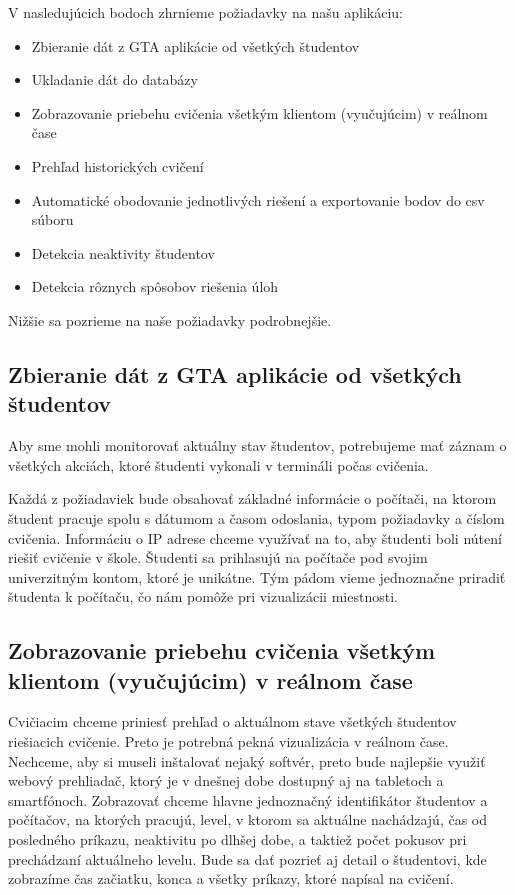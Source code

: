 V nasledujúcich bodoch zhrnieme požiadavky na našu aplikáciu:

\begin{itemize}
	\item Zbieranie dát z GTA aplikácie od všetkých študentov
	\item Ukladanie dát do databázy
	\item Zobrazovanie priebehu cvičenia všetkým klientom (vyučujúcim) v reálnom čase
	\item Prehľad historických cvičení
	\item Automatické obodovanie jednotlivých riešení a exportovanie bodov do csv súboru
	\item Detekcia neaktivity študentov
	\item Detekcia rôznych spôsobov riešenia úloh
\end{itemize}

Nižšie sa pozrieme na naše požiadavky podrobnejšie.

\subsection{Zbieranie dát z GTA aplikácie od všetkých študentov}
\label{sec:apprequirements:gtadata}

Aby sme mohli monitorovať aktuálny stav študentov, potrebujeme mať záznam o
všetkých akciách, ktoré študenti vykonali v termináli počas cvičenia.

Každá z požiadaviek bude obsahovať základné informácie o počítači, na ktorom
študent pracuje spolu s dátumom a časom odoslania, typom požiadavky a číslom cvičenia.
Informáciu o IP adrese chceme využívať na to, aby študenti boli nútení
riešiť cvičenie v škole.
Študenti sa prihlasujú na počítače pod svojim univerzitným kontom, ktoré je unikátne.
Tým pádom vieme jednoznačne priradiť študenta k počítaču, čo nám pomôže pri
vizualizácii miestnosti.


\subsection{Zobrazovanie priebehu cvičenia všetkým klientom (vyučujúcim) v reálnom čase}
\label{sec:apprequirements:visualization}

Cvičiacim chceme priniesť prehľad o aktuálnom stave všetkých študentov riešiacich
cvičenie. Preto je potrebná pekná vizualizácia v reálnom čase.
Nechceme, aby si museli inštalovať nejaký softvér, preto bude najlepšie využiť webový prehliadač, ktorý je v dnešnej dobe dostupný aj na tabletoch a smartfónoch.
Zobrazovať chceme hlavne jednoznačný identifikátor študentov a počítačov, na ktorých
pracujú, level, v ktorom
sa aktuálne nachádzajú, čas od posledného príkazu, neaktivitu po dlhšej dobe,
a taktiež počet pokusov pri prechádzaní aktuálneho levelu. Bude sa dať pozrieť
aj detail o študentovi, kde zobrazíme čas začiatku, konca a všetky príkazy, ktoré
napísal na cvičení.

